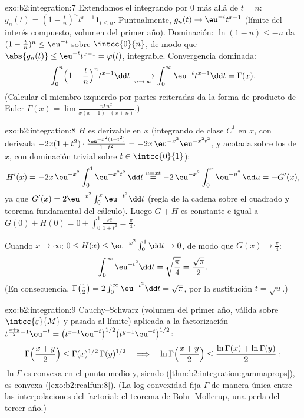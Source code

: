 \begin{solution}{exo:b2:integration:7}
Extendamos el integrando por $0$ más allá de $t = n$: $g_n(t) = (1 -
\frac tn)^n t^{x-1}\mathbf{1}_{t \leq n}$. Puntualmente, $g_n(t) \to
\eu^{-t}t^{x-1}$ (límite del interés compuesto, volumen del primer
año). Dominación: $\ln(1 - u) \leq -u$ da $(1 - \frac tn)^n \leq
\eu^{-t}$ sobre $\intcc{0}{n}$, de modo que $\abs{g_n(t)} \leq
\eu^{-t}t^{x-1} = \varphi(t)$, integrable. Convergencia dominada:
\[
\int_0^n \Bigl(1 - \frac tn\Bigr)^n t^{x-1}\dd t
\xrightarrow[n\to\infty]{} \int_0^\infty \eu^{-t}t^{x-1}\dd t
= \Gamma(x) .
\]
(Calcular el miembro izquierdo por partes reiteradas da la forma de
producto de Euler $\Gamma(x) = \lim
\frac{n!\,n^x}{x(x+1)\cdots(x+n)}$.)
\end{solution}

\begin{solution}{exo:b2:integration:8}
$H$ es derivable en $x$ (integrando de clase $C^1$ en $x$, con
derivada $-2x(1+t^2)\cdot\frac{\eu^{-x^2(1+t^2)}}{1+t^2} =
-2x\,\eu^{-x^2}\eu^{-x^2t^2}$,  y acotada sobre los
 de $x$, con dominación trivial sobre $t \in
\intcc{0}{1}$):
\[
H'(x) = -2x\,\eu^{-x^2}\int_0^1 \eu^{-x^2t^2}\,\dd t
\overset{u = xt}{=} -2\,\eu^{-x^2}\int_0^x \eu^{-u^2}\,\dd u
= -G'(x),
\]
ya que $G'(x) = 2\eu^{-x^2}\int_0^x \eu^{-t^2}\dd t$ (regla de la
cadena sobre el cuadrado y teorema fundamental del cálculo). Luego
$G + H$ es constante e igual a $G(0) + H(0) = 0 + \int_0^1 \frac{\dd
t}{1+t^2} = \frac\pi4$.

Cuando $x \to \infty$: $0 \leq H(x) \leq \eu^{-x^2}\int_0^1 \dd t
\to 0$, de modo que $G(x) \to \frac\pi4$:
\[
\int_0^\infty \eu^{-t^2}\dd t = \sqrt{\frac\pi4} =
\frac{\sqrt\pi}{2} .
\]
(En consecuencia, $\Gamma\bigl(\frac12\bigr) = 2\int_0^\infty
\eu^{-t^2}\dd t = \sqrt\pi$, por la sustitución $t = \sqrt u$.)
\end{solution}

\begin{solution}{exo:b2:integration:9}
Cauchy--Schwarz (volumen del primer año, válida sobre
$\intcc{\varepsilon}{M}$ y pasada al límite) aplicada a la
factorización $t^{\frac{x+y}{2}-1}\eu^{-t} =
\bigl(t^{x-1}\eu^{-t}\bigr)^{1/2} \bigl(t^{y-1}\eu^{-t}\bigr)^{1/2}$:
\[
\Gamma\Bigl(\frac{x+y}{2}\Bigr) \leq
\Gamma(x)^{1/2}\,\Gamma(y)^{1/2}
\quad\Longrightarrow\quad
\ln\Gamma\Bigl(\frac{x+y}{2}\Bigr) \leq \frac{\ln\Gamma(x) +
\ln\Gamma(y)}{2} :
\]
$\ln\Gamma$ es convexa en el punto medio y, siendo 
(\cref{thm:b2:integration:gammaprops}), es convexa
(\cref{exo:b2:realfun:8}). (La log-convexidad fija $\Gamma$ de
manera única entre las interpolaciones del factorial: el teorema de
Bohr--Mollerup, una perla del tercer año.)
\end{solution}


